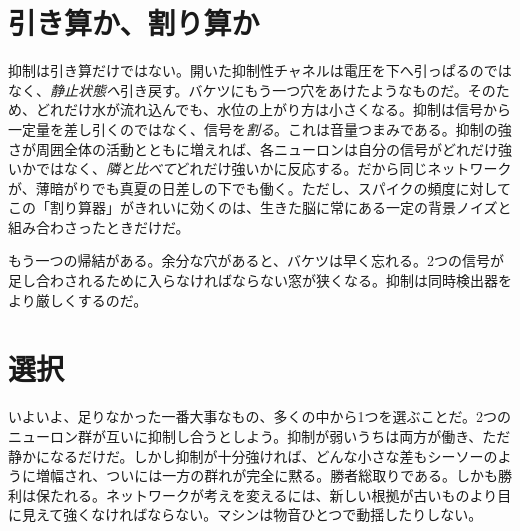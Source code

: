 \section*{引き算か、割り算か}

抑制は引き算だけではない。開いた抑制性チャネルは電圧を下へ引っぱるのではなく、\emph{静止状態へ}引き戻す。バケツにもう一つ穴をあけたようなものだ。そのため、どれだけ水が流れ込んでも、水位の上がり方は小さくなる。抑制は信号から一定量を差し引くのではなく、信号を\emph{割る}。これは音量つまみである。抑制の強さが周囲全体の活動とともに増えれば、各ニューロンは自分の信号がどれだけ強いかではなく、\emph{隣と比べて}どれだけ強いかに反応する。だから同じネットワークが、薄暗がりでも真夏の日差しの下でも働く。ただし、スパイクの頻度に対してこの「割り算器」がきれいに効くのは、生きた脳に常にある一定の背景ノイズと組み合わさったときだけだ。


もう一つの帰結がある。余分な穴があると、バケツは早く忘れる。2つの信号が足し合わされるために入らなければならない窓が狭くなる。抑制は同時検出器をより厳しくするのだ。

\section*{選択}

いよいよ、足りなかった一番大事なもの、多くの中から1つを選ぶことだ。2つのニューロン群が互いに抑制し合うとしよう。抑制が弱いうちは両方が働き、ただ静かになるだけだ。しかし抑制が十分強ければ、どんな小さな差もシーソーのように増幅され、ついには一方の群れが完全に黙る。勝者総取りである。しかも勝利は保たれる。ネットワークが考えを変えるには、新しい根拠が古いものより目に見えて強くなければならない。マシンは物音ひとつで動揺したりしない。

